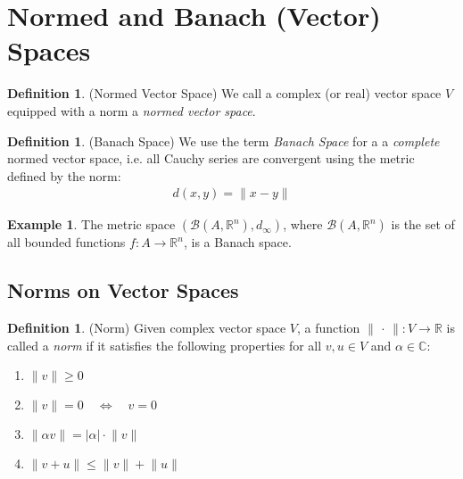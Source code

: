 \documentclass[12pt]{book}
\numberwithin{equation}{section} %
\theoremstyle{plain}
\theoremstyle{definition}
\newtheorem{defn}[thm]{Definition}
\newtheorem{ex}[thm]{Example}
\theoremstyle{remark}
\newcommand{\R}{\mathbb{R}}
\newcommand{\Rmm}{\mathbb{R}^{m\times m}}
\newcommand{\C}{\mathbb{C}}
\begin{document}






\clearpage
\section{Normed and Banach (Vector) Spaces}


\begin{defn}(Normed Vector Space)
We call a complex (or real) vector space $V$ equipped with a norm a
\emph{normed vector space}.
\end{defn}

\begin{defn}(Banach Space)
We use the term \emph{Banach Space} for a a \emph{complete} normed
vector space, i.e. all Cauchy series are convergent using the metric
defined by the norm:
\begin{align*}
  d(x,y) = \lVert x-y\rVert
\end{align*}
\end{defn}


\begin{ex}
The metric space $\left(\mathscr{B}(A,\R^n), d_\infty\right)$,
where $\mathscr{B}(A,\R^n)$ is the set of all bounded functions
$f:A\rightarrow \R^n$, is a Banach space.
\end{ex}



\subsection{Norms on Vector Spaces}

\begin{defn}(Norm)
Given complex vector space $V$, a function
$\lVert\,\cdot\,\rVert:V\rightarrow \R$ is called a \emph{norm} if it
satisfies the following properties for all $v,u\in V$ and $\alpha\in
\C$:
\begin{enumerate}[label=(\roman*)]
  \item $\lVert v\rVert\geq 0$
  \item $\lVert v\rVert=0 \quad \iff \quad v=0$
  \item $\lVert \alpha v\rVert= |\alpha| \cdot \lVert v\rVert$
  \item $\lVert v+u\rVert \leq \lVert v\rVert + \lVert u\rVert$
\end{enumerate}
\end{defn}
\end{document}
